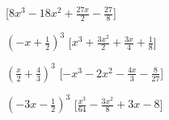 \begin{esercizio}
\begin{multicols}{2}
\begin{enumeratea}
  \hfill [\(8 x^{3} - 18 x^{2} + \frac{27 x}{2} - \frac{27}{8}\)]
\item \(\left(- x + \frac{1}{2}\right)^{3}\)
  \hfill [\(x^{3} + \frac{3 x^{2}}{2} + \frac{3 x}{4} + \frac{1}{8}\)]
\item \(\left(\frac{x}{2} + \frac{4}{3}\right)^{3}\)
  \hfill [\(- x^{3} - 2 x^{2} - \frac{4 x}{3} - \frac{8}{27}\)]
\item \(\left(- 3 x - \frac{1}{2}\right)^{3}\)
  \hfill [\(\frac{x^{3}}{64} - \frac{3 x^{2}}{8} + 3 x - 8\)]
 \end{enumeratea}
\end{multicols}
\end{esercizio}

